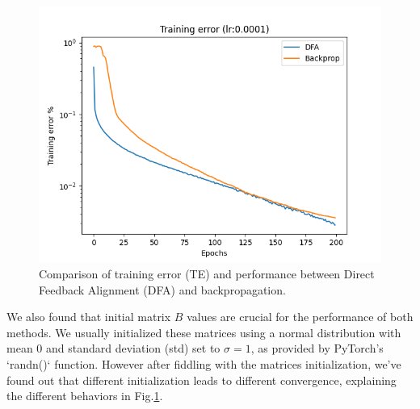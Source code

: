 \documentclass[english]{article}
\begin{document}
\begin{figure}[H]
\begin{minipage}{0.48\textwidth}
    \end{minipage}%
    \\
    \begin{minipage}{0.48\textwidth}
        \centering
        \includegraphics[width=\linewidth]{rsc/DFA_BACK/DFA_Back_COMP_TE_DFA_leading.png}
    \end{minipage}%
    \caption{Comparison of training error (TE) and performance between Direct Feedback Alignment (DFA) and backpropagation.}
\label{fig:DFA_BACK_group}
\end{figure}











We also found that initial matrix \( B \) values are crucial for the performance of both methods. We usually initialized these matrices using a normal distribution with mean 0 and standard deviation (std) set to \(\sigma=1\), as provided by PyTorch's `randn()` function. However after fiddling with the matrices initialization, we've found out that different initialization leads to different convergence, explaining the different behaviors in Fig.\ref{fig:DFA_BACK_group}.
\end{document}
